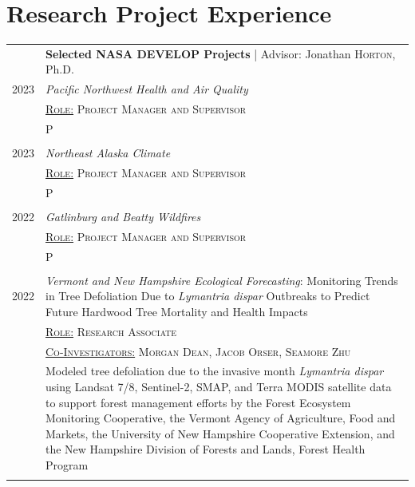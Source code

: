 \section{Research Project Experience}

\setlength{\arrayrulewidth}{.01pt}
\setlength{\tabcolsep}{8pt}

\noindent
\begin{tabular}{r|L{14cm}}

    & \textbf{Selected NASA DEVELOP Projects} {\hfill| \small Advisor: Jonathan \textsc{Horton}, Ph.D.}\\ 
    \textsc{2023} 
    & \footnotesize{\emph{Pacific Northwest Health and Air Quality}}\\
    & \footnotesize{\textsc{\underline{Role:} Project Manager and Supervisor}} \\
    & \footnotesize{P}
    \\&\\
    
    \textsc{2023} 
    & \footnotesize{\emph{Northeast Alaska Climate}}\\
    & \footnotesize{\textsc{\underline{Role:} Project Manager and Supervisor}} \\
    & \footnotesize{P}
    \\&\\
    
    \textsc{2022} 
    & \footnotesize{\emph{Gatlinburg and Beatty Wildfires}}\\
    & \footnotesize{\textsc{\underline{Role:} Project Manager and Supervisor}} \\
    & \footnotesize{P}
    \\&\\
    
    \textsc{2022} 
    & \footnotesize{\emph{Vermont and New Hampshire Ecological Forecasting}: Monitoring Trends in Tree Defoliation Due to \textit{Lymantria dispar} Outbreaks to Predict Future Hardwood Tree Mortality and Health Impacts}\\
    & \footnotesize{\textsc{\underline{Role:} Research Associate}} \\
    & \footnotesize{\textsc{\underline{Co-Investigators:} Morgan Dean, Jacob Orser, Seamore Zhu}}\\
    & \footnotesize{Modeled tree defoliation due to the invasive month \textit{Lymantria dispar} using Landsat 7/8, Sentinel-2, SMAP, and Terra MODIS satellite data to support forest management efforts by the Forest Ecosystem Monitoring Cooperative, the Vermont Agency of Agriculture, Food and Markets, the University of New Hampshire Cooperative Extension, and the New Hampshire Division of Forests and Lands, Forest Health Program
    }
    \\&\\
    

\end{tabular}

